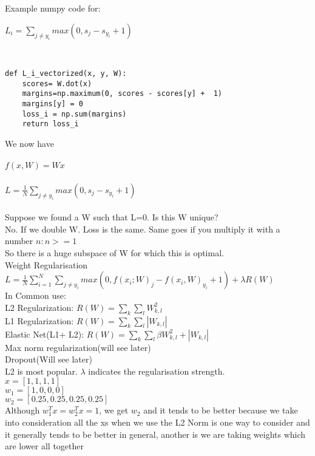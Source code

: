 \documentclass{article}
\begin{document}
\\\\Example numpy code for:
\\
\centerline{$L_i = \sum_{j \neq y_i} max(0,s_j - s_{y_i} +1)$} \\
\begin{lstlisting}
def L_i_vectorized(x, y, W):
	scores= W.dot(x)
	margins=np.maximum(0, scores - scores[y] +  1)
	margins[y] = 0
	loss_i = np.sum(margins)
	return loss_i
\end{lstlisting}
We now have\\\\
$f(x, W) = Wx$\\
\\ $L=\frac{1}{N}\sum_{j \neq y_i} max(0,s_j - s_{y_i} +1)$\\
\\
Suppose we found a W such that L=0. Is this W unique?
\\
No. If we double W. Loss is the same. Same goes if you multiply it with a number $n : n>=1$\\
So there is a huge subspace of W for which this is optimal.
\\ Weight Regularisation
\\ $L=\frac{1}{N}\sum_{i=1}^{N} \sum_{j \neq y_i} max(0, f(x_i; W)_j - f(x_i, W)_{y_i}+1) + \lambda R(W)$\\
In Common use:\\
L2 Regularization: $R(W)  = \sum_k \sum_l W_{k,l} ^ 2$\\
L1 Regularization: $R(W)  = \sum_k \sum_l |W_{k,l} |$\\
Elastic Net(L1+ L2): $R(W)  = \sum_k \sum_l \beta W_{k,l} ^ 2 + |W_{k,l} |$\\
Max norm regularization(will see later)\\
Dropout(Will see later)\\
L2 is most popular. $\lambda$ indicates the regularisation strength. \\
$ x = [1, 1, 1, 1] $\\
$ w_1=[1, 0, 0, 0] $\\
$ w_2 = [0.25, 0.25, 0.25 , 0.25 ] $ \\
Although $ w_1^{T}x = w_2 ^{T} x = 1$, we get $w_2$ and it tends to be better because we take into consideration all the xs when we use the L2 Norm is one way to consider and it generally tends to be better in general, another is we are taking weights which are lower all together\\ \\ \\ \\ \\ \\ \\
\end{document}
